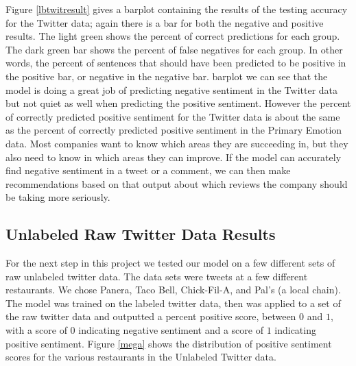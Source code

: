 \documentclass[titlepage,letterpaper]{article}
\begin{document}
Figure \ref{lbtwitresult} gives a barplot containing the results of the testing accuracy for the Twitter data; again there is a bar for both the negative and positive results. The light green shows the percent of correct predictions for each group. The dark green bar shows the percent of false negatives for each group. In other words, the percent of sentences that should have been predicted to be positive in the positive bar, or negative in the negative bar. 
 barplot we can see that the model is doing a great job of predicting negative sentiment in the Twitter data but not quiet as well when predicting the positive sentiment. However the percent of correctly predicted positive sentiment for the Twitter data is about the same as the percent of correctly predicted positive sentiment in the Primary Emotion data. Most companies want to know which areas they are succeeding in, but they also need to know in which areas they can improve. If the model can accurately find negative sentiment in a tweet or a comment, we can then make recommendations based on that output about which reviews the company should be taking more seriously. 



\subsection{Unlabeled Raw Twitter Data Results}




For the next step in this project we tested our model on a few different sets of raw unlabeled twitter data. The data sets were tweets at a few different restaurants. We chose Panera, Taco Bell, Chick-Fil-A, and Pal's (a local chain). The model was trained on the labeled twitter data, then was applied to a set of the raw twitter data and outputted a percent positive score, between $0$ and $1$, with a score of $0$ indicating negative sentiment and a score of $1$ indicating positive sentiment. Figure \ref{mega} shows the distribution of positive sentiment scores for the various restaurants in the Unlabeled Twitter data.
\end{document}
